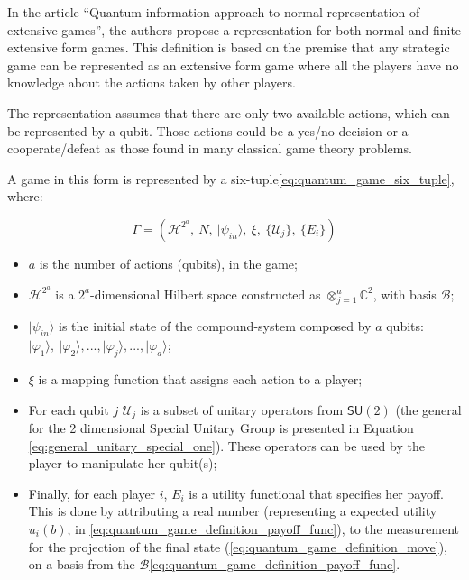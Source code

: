 In the article ``Quantum information approach to normal representation of extensive games''\cite{Fra2011a}, the authors propose a representation
for both normal and finite extensive form games\cite{Fra2011}. This definition is based on the premise that any strategic game can be represented as an extensive form game where all the players have no knowledge about the actions taken by other players. 

The representation assumes that there
are only two available actions, which can be represented by a qubit.
Those actions could be a yes/no decision or a cooperate/defeat as
those found in many classical game theory problems. 

A game in this
form is represented by a six-tuple\ref{eq:quantum_game_six_tuple},
where:

\begin{equation}
\Gamma=(\mathcal{H}^{2^{a}},\: N,\:\vert\psi_{in}\rangle,\:\xi,\:\{\mathcal{U}_{j}\},\:\{E_{i}\})\label{eq:quantum_game_six_tuple}
\end{equation}

\begin{itemize}
\item $a$ is the number of actions (qubits), in the game; 
\item $\mathcal{H}^{2^{a}}$ is a $2^{a}$-dimensional Hilbert space constructed
as $\otimes_{j=1}^{a}\mathbb{C}^{2}$, with basis $\mathcal{B}$;
\item $\vert\psi_{in}\rangle$ is the initial state of the compound-system
composed by $a$ qubits: $\vert\varphi_{1}\rangle,\:\vert\varphi_{2}\rangle, ..., \vert\varphi_{j}\rangle, ..., \vert\varphi_{a}\rangle$;
\item $\xi$ is a mapping function that assigns each action to a player;
\item For each qubit $j$ $\mathcal{U}_{j}$ is a subset of unitary operators from $\mathsf{SU}(2)$ (the general for the 2 dimensional Special Unitary Group is presented in Equation \ref{eq:general_unitary_special_one}).
These operators can be used by the player to manipulate her qubit(s);
\item Finally, for each player $i$, $E_{i}$ is a utility functional that
specifies her payoff. This is done by attributing a real number (representing a expected utility $ u_{i}(b)$, in \ref{eq:quantum_game_definition_payoff_func}), to the measurement for the projection of the final state (\ref{eq:quantum_game_definition_move}), on a basis from the $\mathcal{B}$\ref{eq:quantum_game_definition_payoff_func}.\end{itemize}

